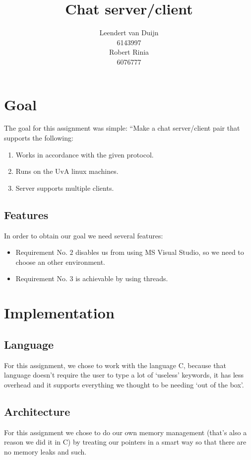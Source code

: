 \documentclass[a4paper]{article}
\author{Leendert van Duijn\\6143997\\Robert Rinia\\6076777}
\title{Chat server/client}
\begin{document}
\maketitle
\tableofcontents
\newpage
\section{Goal}
The goal for this assignment was simple: ``Make a chat server/client pair that
supports the following:\\

\begin{enumerate}
\item \label{1}Works in accordance with the given protocol.
\item \label{2}Runs on the UvA linux machines.
\item \label{3}Server supports multiple clients.
\end{enumerate}

\subsection{Features}
In order to obtain our goal we need several features:\\
\begin{itemize}
\item Requirement No. $2$ disables us from using MS Visual Studio, so we need
to choose an other environment.
\item Requirement No. $3$ is achievable by using threads.
\end{itemize}

\section{Implementation}
\subsection{Language}
For this assignment, we chose to work with the language C, because that
language doesn't require the user to type a lot of `useless' keywords, it has
less overhead and it supports everything we thought to be needing `out of the
box'.

\subsection{Architecture}
For this assignment we chose to do our own memory management (that's also a
reason we did it in C) by treating our pointers in a smart way so that there
are no memory leaks and such.
\end{document}
